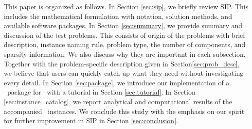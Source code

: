 This paper is organized as follows. In Section \ref{sec:sip}, we briefly review SIP. This 
includes the mathematical formulation with notation, solution methods, and available software 
packages. In Section \ref{sec:summary}, we provide summary and discussion of the test 
problems. This consists of origin of the problems with brief description, instance naming 
rule, problem type, the number of components, and sparsity information. We also discuss why 
they are important in each subsection. Together with the problem-specific description given 
in Section\ref{sec:prob_desc}, we believe that users can quickly catch up what they need 
without investigating every detail. In Section \ref{sec:package}, we introduce our 
implementation of a \julia\ package for \siplibtwo\ with a tutorial in Section 
\ref{sec:tutorial}. In Section \ref{sec:instance_catalog}, we report analytical and 
computational results of the accompanied \smps\ instances. We conclude this study with the 
emphasis on our spirit for further improvement in SIP in Section \ref{sec:conclusion}. 







